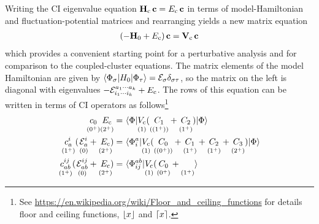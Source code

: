 \documentclass[11pt]{article}
\numberwithin{equation}{section}
\begin{document}
\begin{rmk}
\label{rmk:ci-perturbative-analysis}
Writing the CI eigenvalue equation $\mathbf{H}_{\mathrm{c}}\,\mathbf{c}=E_{\mathrm{c}}\,\mathbf{c}$ in terms of model-Hamiltonian and fluctuation-potential matrices and rearranging yields a new matrix equation
\begin{align}
\label{eq:ci-matrix-equation}
  (
  -
    \mathbf{H}_0
  +
    E_{\mathrm{c}}
  )\,
  \mathbf{c}
=
  \mathbf{V}_{\mathrm{c}}\,
  \mathbf{c}
\end{align}
which provides a convenient starting point for a perturbative analysis and for comparison to the coupled-cluster equations.
The matrix elements of the model Hamiltonian are given by
$
  \langle\Phi _{\sigma }|H_0|\Phi _{\tau }\rangle
=
  \mathcal{E}_{\sigma }
  \delta _{\sigma \tau }
$,
so the matrix on the left is diagonal with eigenvalues
$
-
  \mathcal{E}_{i_1\cdots i_k}^{a_1\cdots a_k}
+
  E_{\mathrm{c}}
$.
The rows of this equation can be written in terms of CI operators as follows\footnote{See \url{https://en.wikipedia.org/wiki/Floor_and_ceiling_functions} for details floor and ceiling functions, $\left\lfloor x\right\rfloor$ and $\left\lceil x\right\rceil$.}
\begin{align}
\label{eq:ci-reference-equation}
  \underset{(0^+)}{\vphantom{(}
  c_0
  }
  \underset{(2^+)}{\vphantom{(}
    E_{\mathrm{c}}
  }
=&\
  \langle\Phi |
  \underset{(1)}{\vphantom{(}
    V_{\mathrm{c}}
  }
    (
    \underset{((1^+))}{\vphantom{(}
      C_1
    }
    +
    \underset{(1^+)}{\vphantom{(}
      C_2
    }
    )
  |\Phi \rangle
\\
\label{eq:ci-singles-equation}
  \underset{(1^+)}{\vphantom{(}
  c_a^i
  }
  (\hspace{1pt}
  \underset{(0)}{\vphantom{(}
    \mathcal{E}_a^i
  }
  +
  \underset{(2^+)}{\vphantom{(}
    E_{\mathrm{c}}
  }
  \hspace{-2pt}
  )
=&\
  \langle\Phi _i^a|
  \underset{(1)}{\vphantom{(}
    V_{\mathrm{c}}
  }
    (
    \underset{((0^+))}{\vphantom{(}
      C_0
    }
    +
    \underset{(1^+)}{\vphantom{(}
      C_1
    }
    +
    \underset{(1^+)}{\vphantom{(}
      C_2
    }
    +
    \underset{(2^+)}{\vphantom{(}
      C_3
    }
    )
  |\Phi \rangle
\\
\label{eq:ci-doubles-equation}
  \underset{(1^+)}{\vphantom{(}
  c_{ab}^{ij}
  }
  (\hspace{1pt}
  \underset{(0)}{\vphantom{(}
    \mathcal{E}_{ab}^{ij}
  }
  +
  \underset{(2^+)}{\vphantom{(}
    E_{\mathrm{c}}
  }
  \hspace{-2pt}
  )
=&\
  \langle\Phi _{ij}^{ab}|
  \underset{(1)}{\vphantom{(}
    V_{\mathrm{c}}
  }
    (
    \underset{(0^+)}{\vphantom{(}
      C_0
    }
    +
    \underset{(1^+)}{\vphantom{(}
}\rangle
\end{align}
\end{rmk}
\end{document}
